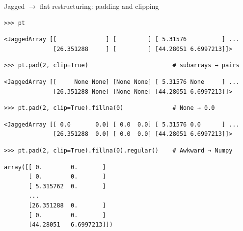 \documentclass[aspectratio=169]{beamer}
\begin{document}
\begin{frame}[fragile]{Jagged $\to$ flat restructuring: padding and clipping}
\small
\begin{verbatim}
>>> pt
\end{verbatim}

\vspace{-0.45 cm}
\color{darkblue}\begin{verbatim}
<JaggedArray [[              ] [         ] [ 5.31576          ] ...
              [26.351288     ] [         ] [44.28051 6.6997213]]>
\end{verbatim}
\color{black}

\vspace{-0.5\baselineskip}
\begin{verbatim}
>>> pt.pad(2, clip=True)                        # subarrays → pairs
\end{verbatim}

\vspace{-0.45 cm}
\color{darkblue}\begin{verbatim}
<JaggedArray [[     None None] [None None] [ 5.31576 None     ] ...
              [26.351288 None] [None None] [44.28051 6.6997213]]>
\end{verbatim}
\color{black}

\vspace{-0.5\baselineskip}
\begin{verbatim}
>>> pt.pad(2, clip=True).fillna(0)              # None → 0.0
\end{verbatim}

\vspace{-0.45 cm}
\color{darkblue}\begin{verbatim}
<JaggedArray [[ 0.0       0.0] [ 0.0  0.0] [ 5.31576 0.0      ] ...
              [26.351288  0.0] [ 0.0  0.0] [44.28051 6.6997213]]>
\end{verbatim}
\color{black}

\vspace{-0.5\baselineskip}
\begin{verbatim}
>>> pt.pad(2, clip=True).fillna(0).regular()    # Awkward → Numpy
\end{verbatim}

\vspace{-0.45 cm}
\color{darkblue}\begin{verbatim}
array([[ 0.        0.       ]
       [ 0.        0.       ]
       [ 5.315762  0.       ]
       ...
       [26.351288  0.       ]
       [ 0.        0.       ]
       [44.28051   6.6997213]])
\end{verbatim}
\color{black}
\end{frame}
\end{document}
